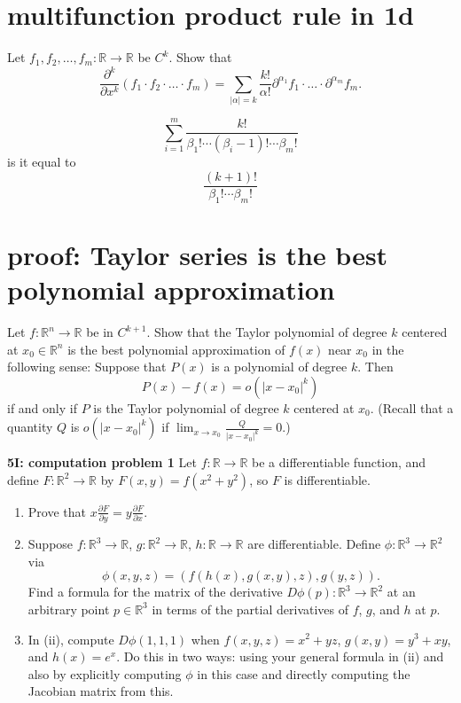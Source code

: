\documentclass[lang=cn,11pt]{template}
\begin{document}
\section{multifunction product rule in 1d}
Let $f_1, f_2, \ldots, f_m : \mathbb{R} \to \mathbb{R}$ be $C^k$. Show that
\[
\frac{\partial^k}{\partial x^k}(f_1 \cdot f_2 \cdot \ldots \cdot f_m) = \sum_{|\alpha| = k} \frac{k!}{\alpha!} \partial^{\alpha_1} f_1 \cdot \ldots \cdot \partial^{\alpha_m} f_m.
\]


$$
\sum_{i=1}^m \frac{k!}{\beta_1 ! \cdots (\beta_i- 1)! \cdots \beta_m !}
$$
is it equal to 
$$
 \frac{(k+1)!}{\beta_1 !  \cdots \beta_m !}
$$


\section{proof: Taylor series is the best polynomial approximation}
Let $f : \mathbb{R}^n \to \mathbb{R}$ be in $C^{k+1}$. Show that the Taylor polynomial of degree $k$ centered at $x_0 \in \mathbb{R}^n$ is the best polynomial approximation of $f(x)$ near $x_0$ in the following sense: Suppose that $P(x)$ is a polynomial of degree $k$. Then
\[
P(x) - f(x) = o(|x - x_0|^k)
\]
if and only if $P$ is the Taylor polynomial of degree $k$ centered at $x_0$. (Recall that a quantity $Q$ is $o(|x - x_0|^k)$ if $\lim_{x \to x_0} \frac{Q}{|x - x_0|^k} = 0$.)


\noindent \textbf{5I: computation problem 1}
Let $f : \mathbb{R} \to \mathbb{R}$ be a differentiable function, and define $F : \mathbb{R}^2 \to \mathbb{R}$ by $F(x, y) = f(x^2 + y^2)$, so $F$ is differentiable.

\begin{enumerate}
    \item Prove that $x \frac{\partial F}{\partial y} = y \frac{\partial F}{\partial x}$.
    \item Suppose $f : \mathbb{R}^3 \to \mathbb{R}$, $g : \mathbb{R}^2 \to \mathbb{R}$, $h : \mathbb{R} \to \mathbb{R}$ are differentiable. Define $\phi : \mathbb{R}^3 \to \mathbb{R}^2$ via
    \[
    \phi(x, y, z) = (f(h(x), g(x, y), z), g(y, z)).
    \]
    Find a formula for the matrix of the derivative $D\phi(p) : \mathbb{R}^3 \to \mathbb{R}^2$ at an arbitrary point $p \in \mathbb{R}^3$ in terms of the partial derivatives of $f$, $g$, and $h$ at $p$.
    \item In (ii), compute $D\phi(1, 1, 1)$ when $f(x, y, z) = x^2 + yz$, $g(x, y) = y^3 + xy$, and $h(x) = e^x$. Do this in two ways: using your general formula in (ii) and also by explicitly computing $\phi$ in this case and directly computing the Jacobian matrix from this.
\end{enumerate}
\end{document}
